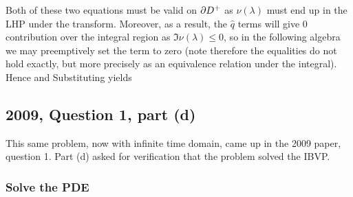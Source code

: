 \documentclass{article}
\begin{document}
Both of these two equations must be valid on $\partial D^+$ as $\nu(\lambda)$ must end up in the LHP under the transform. Moreover, as a result, the $\hat{q}$ terms will give 0 contribution over the integral region as $\Im \nu(\lambda) \leq 0$, so in the following algebra we may preemptively set the term to zero (note therefore the equalities do not hold exactly, but more precisely as an equivalence relation under the integral). Hence
and 
Substituting yields 

\subsection{2009, Question 1, part (d)}
This same problem, now with infinite time domain, came up in the 2009 paper, question 1. Part (d) asked for verification that the problem solved the IBVP. 

\subsubsection{Solve the PDE}

\subsubsection{}
\end{document}
